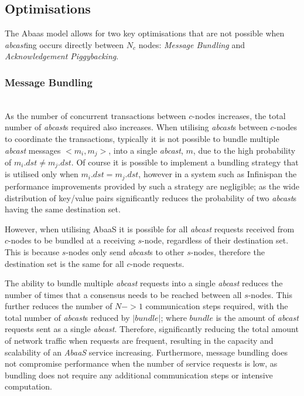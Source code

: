 	\subsection{Optimisations}\label{ssec:abaas_optimisations}
	The \textsf{Abaas} model allows for two key optimisations that are not possible when \emph{abcast}ing occurs directly between $N_c$ nodes: \emph{Message Bundling} and \emph{Acknowledgement Piggybacking}.  
	
		\subsubsection{Message Bundling} \label{ssec:bundling} \hspace{0pt} \\
		As the number of concurrent transactions between $c$-nodes increases, the total number of \emph{abcast}s required also increases.  When utilising \emph{abcast}s between $c$-nodes to coordinate the transactions, typically it is not possible to bundle multiple \emph{abcast} messages $<m_i, m_j>$, into a single \emph{abcast}, $m$, due to the high probability of $m_i.dst \neq m_j.dst$.  Of course it is possible to implement a bundling strategy that is utilised only when $m_i.dst = m_j.dst$, however in a system such as Infinispan the performance improvements provided by such a strategy are negligible; as the wide distribution of key/value pairs significantly reduces the probability of two \emph{abcast}s having the same destination set.  
		
		However, when utilising \textsf{AbaaS} it is possible for all \emph{abcast} requests received from $c$-nodes to be bundled at a receiving $s$-node, regardless of their destination set.  This is because $s$-nodes only send \emph{abcast}s to other $s$-nodes, therefore the destination set is the same for all $c$-node requests.  
		
		The ability to bundle multiple \emph{abcast} requests into a single \emph{abcast} reduces the number of times that a consensus needs to be reached between all $s$-nodes.  This further reduces the number of $N->1$ communication steps required, with the total number of \emph{abcast}s reduced by $\left\vert bundle \right\vert$; where $bundle$ is the amount of \emph{abcast} requests sent as a single \emph{abcast}.  Therefore, significantly reducing the total amount of network traffic when requests are frequent, resulting in the capacity and scalability of an \emph{AbaaS} service increasing.  Furthermore, message bundling does not compromise performance when the number of service requests is low, as bundling does not require any additional communication steps or intensive computation.  
		
